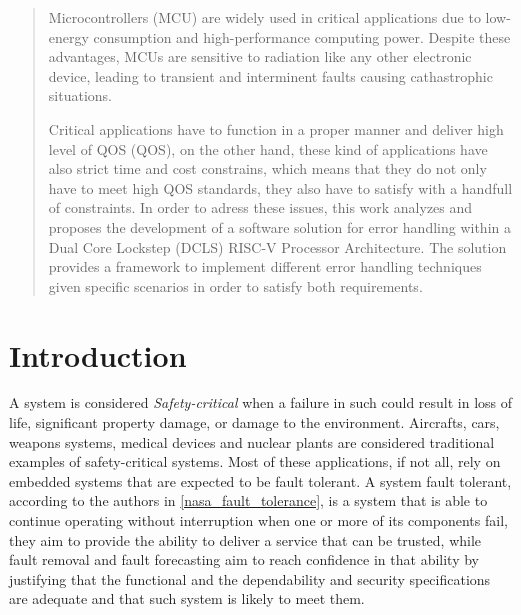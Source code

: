 \documentclass[10pt, a4paper]{report}
\begin{document}
\newpage

\begin{abstract}
    \thispagestyle{fancy}
    Microcontrollers (\acrshort{MCU}) are widely used in critical applications 
    due to low-energy consumption and high-performance computing power. Despite 
    these advantages, \acrshort{MCU}s are sensitive to radiation like any other
    electronic device, leading to transient and interminent faults causing
    cathastrophic situations.

    Critical applications have to function in a proper manner and deliver high
    level of \acrlong{QOS} (\acrshort{QOS}), on the other hand, these kind of
    applications have also strict time and cost constrains, which means that
    they do not only have to meet high \acrshort{QOS} standards, they also have
    to satisfy with a handfull of constraints. In order to adress these issues, 
    this work analyzes and proposes the development of a software solution for 
    error handling within a Dual Core Lockstep (\acrshort{DCLS}) RISC-V 
    Processor Architecture. The solution provides a framework to implement 
    different error handling techniques given specific scenarios in order to 
    satisfy both requirements.
\end{abstract}

\newpage
\begin{tableofcontents}
    \thispagestyle{fancy}
\end{tableofcontents}

\newpage

\chapter{Introduction}

\thispagestyle{fancy}
A system is considered \emph{Safety-critical} when a failure in such could
result in loss of life, significant property damage, or damage to the
environment. Aircrafts, cars, weapons systems, medical devices and nuclear 
plants are considered traditional examples of safety-critical systems. Most of 
these applications, if not all, rely on embedded systems that are expected to be 
fault tolerant. A system fault tolerant, according to the authors in 
\ref{nasa_fault_tolerance}, is a system that is able to continue operating 
without interruption when one or more of its components fail, they aim 
to provide the ability to deliver a service that can be trusted, while fault 
removal and fault forecasting aim to reach confidence in that ability by 
justifying that the functional and the dependability and security specifications 
are adequate and that such system is likely to meet them.
\end{document}
